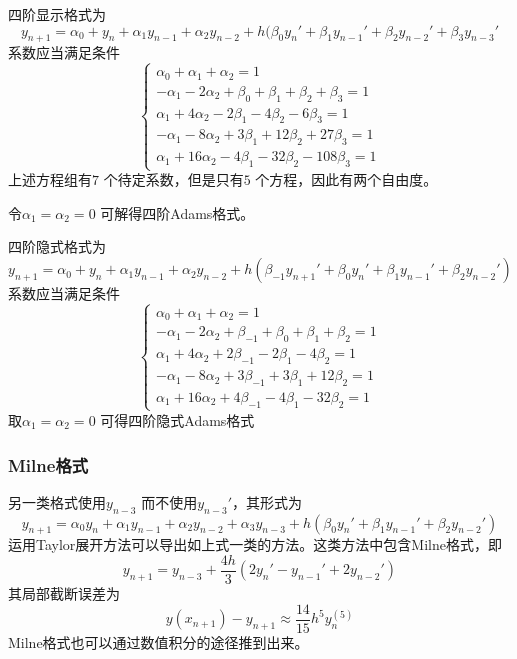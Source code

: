 \documentclass[a4paper]{article}
\begin{document}
四阶显示格式为
\[
y_{n+1} = \alpha_0 + y_{n} + \alpha_1  y_{n-1} + \alpha_2 y_{n-2} + h (\beta_0 y_{n}' + \beta_1 y_{n-1}' + \beta_2 y_{n-2}' + \beta_3 y_{n-3}' \tag{4.5.15} \label{eq:4.5.15} 
\] 
系数应当满足条件
\[
	\tag{4.5.16} \label{eq:4.5.16} 
\begin{cases}
	\alpha_0 + \alpha_1 + \alpha_2 = 1 \\
	-\alpha_1 - 2 \alpha_2 + \beta_0 + \beta_1 + \beta_2 + \beta_3 = 1 \\
	\alpha_1 + 4 \alpha_2 - 2 \beta_1 - 4 \beta_2 - 6 \beta_3 = 1 \\
	- \alpha_1 - 8 \alpha_2 + 3 \beta_1 + 12 \beta_2 + 27 \beta_3 = 1 \\
	\alpha_1 + 16 \alpha_2 - 4 \beta_1 - 32 \beta_2 - 108 \beta_3 = 1
\end{cases} 
\] 
上述方程组有$7$ 个待定系数，但是只有$5$ 个方程，因此有两个自由度。

令$\alpha_1 = \alpha_2 = 0$ 可解得四阶Adams格式。

四阶隐式格式为
\[
	y_{n+1} = \alpha_0 + y_{n} + \alpha_1  y_{n-1} + \alpha_2 y_{n-2} + h (\beta_{-1} y_{n+1}' + \beta_0 y_{n}' + \beta_1 y_{n-1}' + \beta_2 y_{n-2}' ) \tag{4.5.17} \label{eq:4.5.17} 
\] 
系数应当满足条件
\[
	\tag{4.5.18} \label{eq:4.5.18} 
\begin{cases}
	\alpha_0 + \alpha_1 + \alpha_2 = 1 \\
	-\alpha_1 - 2 \alpha_2 + \beta_{-1} + \beta_0 + \beta_1 + \beta_2 = 1 \\
	\alpha_1 + 4 \alpha_2 + 2 \beta_{-1} - 2 \beta_1 - 4 \beta_2 = 1 \\
	- \alpha_1 - 8 \alpha_2 + 3 \beta_{-1} + 3 \beta_1 + 12 \beta_2 = 1 \\
	\alpha_1 + 16 \alpha_2 + 4 \beta_{-1} - 4 \beta_1 - 32 \beta_2 = 1
\end{cases} 
\] 
取$\alpha_1 = \alpha_2 = 0$ 可得四阶隐式Adams格式

\subsubsection{Milne格式}
另一类格式使用$y_{n-3}$ 而不使用$y_{n-3}'$，其形式为
\[
	y_{n+1} = \alpha_0 y_{n} + \alpha_1 y_{n-1} + \alpha_2 y_{n-2} + \alpha_3 y_{n-3} + h(\beta_0 y_{n}' + \beta_1 y_{n-1}' + \beta_2 y_{n-2}') \tag{4.5.19} \label{eq:4.5.19} 
\] 
运用Taylor展开方法可以导出如上式一类的方法。这类方法中包含Milne格式，即
\[
y_{n+1} = y_{n-3} + \frac{4h}{3}(2 y_{n}' - y_{n-1}' + 2y_{n-2}') \tag{4.5.20} \label{eq:4.5.20} 
\] 
其局部截断误差为
\[
y(x_{n+1}) - y_{n+1} \approx \frac{14}{15} h^{5} y_{n}^{(5)} \tag{4.5.21} \label{eq:4.5.21} 
\] 
Milne格式也可以通过数值积分的途径推到出来。
\end{document}
